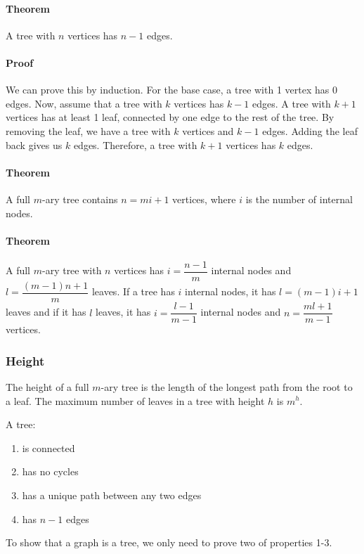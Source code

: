 \documentclass[11pt]{article}
\begin{document}
\paragraph{Theorem}
A tree with $n$ vertices has $n - 1$ edges.
\paragraph{Proof}
We can prove this by induction. For the base case, a tree with 1 vertex has 0 edges. Now, assume that a tree with $k$ vertices has $k - 1$ edges. A tree with $k + 1$ vertices has at least 1 leaf, connected by one edge to the rest of the tree. By removing the leaf, we have a tree with $k$ vertices and $k - 1$ edges. Adding the leaf back gives us $k$ edges. Therefore, a tree with $k + 1$ vertices has $k$ edges.

\paragraph{Theorem}
A full $m$-ary tree contains $n = mi + 1$ vertices, where $i$ is the number of internal nodes. 

\paragraph{Theorem}
A full $m$-ary tree with $n$ vertices has $i = \dfrac{n - 1}{m}$ internal nodes and $l = \dfrac{(m - 1)n + 1}{m}$ leaves. If a tree has $i$ internal nodes, it has $l = (m - 1)i + 1$ leaves and if it has $l$ leaves, it has $i = \dfrac{l - 1}{m - 1}$ internal nodes and $n = \dfrac{ml + 1}{m - 1}$ vertices.

\subsubsection{Height}
The height of a full $m$-ary tree is the length of the longest path from the root to a leaf. The maximum number of leaves in a tree with height $h$ is $m^h$. 

A tree:
\begin{enumerate}
  \item is connected
  \item has no cycles
  \item has a unique path between any two edges
  \item has $n - 1$ edges
\end{enumerate}

To show that a graph is a tree, we only need to prove two of properties 1-3.
\end{document}
